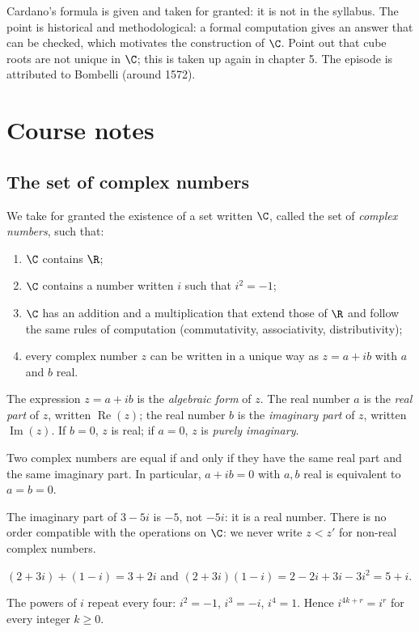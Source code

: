 \begin{teachernote}
Cardano's formula is given and taken for granted: it is not in the syllabus. The point is historical and methodological: a formal computation gives an answer that can be checked, which motivates the construction of $\C$. Point out that cube roots are not unique in $\C$; this is taken up again in chapter 5. The episode is attributed to Bombelli (around 1572).
\end{teachernote}

\mxnewpage
\section{Course notes}
\subsection{The set of complex numbers}
\begin{definition}
We take for granted the existence of a set written $\C$, called the set of \emph{complex numbers}, such that:
\begin{enumerate}
\item $\C$ contains $\R$;
\item $\C$ contains a number written $i$ such that $i^2=-1$;
\item $\C$ has an addition and a multiplication that extend those of $\R$ and follow the same rules of computation (commutativity, associativity, distributivity);
\item every complex number $z$ can be written in a unique way as $z=a+ib$ with $a$ and $b$ real.
\end{enumerate}
The expression $z=a+ib$ is the \emph{algebraic form} of $z$. The real number $a$ is the \emph{real part} of $z$, written $\operatorname{Re}(z)$; the real number $b$ is the \emph{imaginary part} of $z$, written $\operatorname{Im}(z)$. If $b=0$, $z$ is real; if $a=0$, $z$ is \emph{purely imaginary}.
\end{definition}
\begin{theorem}
Two complex numbers are equal if and only if they have the same real part and the same imaginary part. In particular, $a+ib=0$ with $a,b$ real is equivalent to $a=b=0$.
\end{theorem}
\begin{pitfall}
The imaginary part of $3-5i$ is $-5$, not $-5i$: it is a real number. There is no order compatible with the operations on $\C$: we never write $z<z'$ for non-real complex numbers.
\end{pitfall}
\begin{example}
$(2+3i)+(1-i)=3+2i$ and $(2+3i)(1-i)=2-2i+3i-3i^2=5+i$.\par
The powers of $i$ repeat every four: $i^2=-1$, $i^3=-i$, $i^4=1$. Hence $i^{4k+r}=i^r$ for every integer $k\ge0$.
\end{example}

